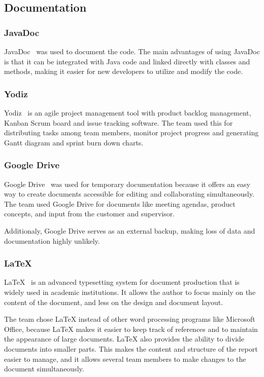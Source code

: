 \subsection{Documentation}

\subsubsection{JavaDoc}
JavaDoc~\cite{javadoc} was used to document the code. The main advantages of using JavaDoc is that it can be integrated with Java code and linked directly with classes and methods, making it easier for new developers to utilize and modify the code.

\subsubsection{Yodiz}
Yodiz~\cite{yodiz} is an agile project management tool with product backlog management, Kanban Scrum board and issue tracking software. The team used this for distributing tasks among team members, monitor project progress and generating Gantt diagram and sprint burn down charts.

\subsubsection{Google Drive}
Google Drive~\cite{gdrive} was used for temporary documentation because it offers an easy way to create documents accessible for editing and collaborating simultaneously. The team used Google Drive for documents like meeting agendas, product concepts, and input from the customer and supervisor. 

Additionaly, Google Drive serves as an external backup, making loss of data and documentation highly unlikely.

\subsubsection{\LaTeX}
\LaTeX~\cite{latex} is an advanced typesetting system for document production that is widely used in
academic institutions. It allows the author to focus mainly on the content of the document, and less on the design and document layout.

The team chose LaTeX instead of other word processing programs like Microsoft Office, because LaTeX makes it easier to keep track of references and to maintain the appearance of large documents. 
LaTeX also provides the ability to divide documents into smaller parts. This makes the content and structure of the report easier to manage, and it allows several team members to make changes to the document simultaneously.


